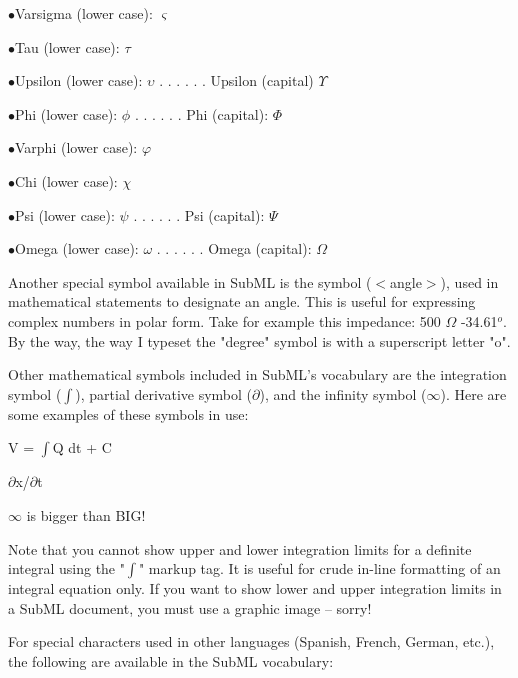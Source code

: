 \item{$\bullet$}Varsigma (lower case): $\varsigma$
\item{$\bullet$}Tau (lower case): $\tau$
\item{$\bullet$}Upsilon (lower case): $\upsilon$ . . . . . . Upsilon (capital) $\Upsilon$
\item{$\bullet$}Phi (lower case): $\phi$ . . . . . . Phi (capital): $\Phi$
\item{$\bullet$}Varphi (lower case): $\varphi$
\item{$\bullet$}Chi (lower case): $\chi$
\item{$\bullet$}Psi (lower case): $\psi$ . . . . . . Psi (capital): $\Psi$
\item{$\bullet$}Omega (lower case): $\omega$ . . . . . . Omega (capital): $\Omega$
\medskip 
 

Another special symbol available in SubML is the \angle{} symbol ($<$angle$>$), used in mathematical statements to designate an angle.  This is useful for expressing complex numbers in polar form.  Take for example this impedance: 500 $\Omega$ \angle{} -34.61$^{o}$.  By the way, the way I typeset the "degree" symbol is with a superscript letter "o".
 

 

Other mathematical symbols included in SubML's vocabulary are the integration symbol ($\int{}$), partial derivative symbol ($\partial{}$), and the infinity symbol ($\infty{}$).  Here are some examples of these symbols in use:
 

\bigskip 
 

V = $\int{}$Q dt + C
 

\bigskip 
 

$\partial{}$x/$\partial{}$t
 

\bigskip 
 

$\infty{}$ is bigger than BIG!
 

\bigskip 
 

Note that you cannot show upper and lower integration limits for a definite integral using the "$\int{}$" markup tag.  It is useful for crude in-line formatting of an integral equation only.  If you want to show lower and upper integration limits in a SubML document, you must use a graphic image -- sorry!
 

 

For special characters used in other languages (Spanish, French, German, etc.), the following are available in the SubML vocabulary:
 

